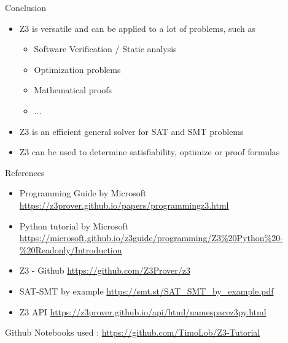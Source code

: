 \documentclass[t, ]{beamer}
\begin{document}
\begin{frame}{Conclusion}
	\begin{itemize}
		\item Z3 is versatile and can be applied to a lot of problems, such as 
		\begin{itemize}
			\item Software Verification / Static analysis
			\item Optimization problems
			\item Mathematical proofs
			\item ...
		\end{itemize}
		\item Z3 is an efficient general solver for SAT and SMT problems
		\item Z3 can be used to determine satisfiability, optimize or proof formulas
	\end{itemize}
\end{frame}


\begin{frame}{References}
	\begin{itemize}
		\item Programming Guide by Microsoft \href{https://z3prover.github.io/papers/programmingz3.html}{https://z3prover.github.io/papers/programmingz3.html}
		\item Python tutorial by Microsoft \href{https://microsoft.github.io/z3guide/programming/Z3\%20Python\%20-\%20Readonly/Introduction}{https://microsoft.github.io/z3guide/programming/Z3\%20Python\%20-\%20Readonly/Introduction} 
		\item Z3 - Github \href{https://github.com/Z3Prover/z3}{https://github.com/Z3Prover/z3}
		\item SAT-SMT by example \href{https://smt.st/SAT\_SMT\_by\_example.pdf}{https://smt.st/SAT\_SMT\_by\_example.pdf}
		\item Z3 API \href{https://z3prover.github.io/api/html/namespacez3py.html}{https://z3prover.github.io/api/html/namespacez3py.html}
		
	\end{itemize}
\end{frame}

\begin{frame}{Github}
	Notebooks used : \href{https://github.com/TimoLob/Z3-Tutorial}{https://github.com/TimoLob/Z3-Tutorial}
\end{frame}
\end{document}
